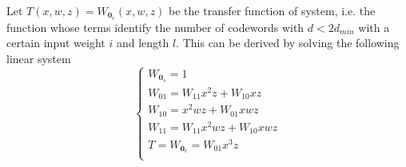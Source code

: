 \documentclass[10pt]{article}
\begin{document}
Let $T(x, w, z) = W_{\mathbf{0}_e} (x, w, z)$ be the transfer function of system, i.e. the function whose terms identify the number of codewords with $d < 2d_{min}$ with a certain input weight $i$ and length $l$. This can be derived by solving the following linear system
\begin{equation}\label{eq:s1}
\begin{cases}
	W_{\mathbf{0}_s} = 1 \\ %
	W_{01} = W_{11}x^2z + W_{10}xz \\
	W_{10} = x^2wz + W_{01}xwz \\
	W_{11} = W_{11}x^2wz + W_{10}xwz \\
	T = W_{\mathbf{0}_e} = W_{01}x^3z\\
\end{cases}
\end{equation}
\end{document}
